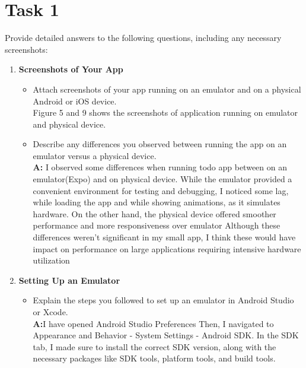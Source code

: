 \documentclass{article}
\begin{document}
        \newpage

        \section*{ Task 1 }

        Provide detailed answers to the following questions, including any necessary screenshots:

        \begin{enumerate}
            \item \textbf{Screenshots of Your App }
                \begin{itemize}
                    \item Attach screenshots of your app running on an emulator and on a physical Android or iOS device.
                    \\
                    Figure 5 and 9 shows the screenshots of application running on emulator and physical device.
                    
                    \item Describe any differences you observed between running the app on an emulator versus a physical device.\\
                    \textbf{A: }I observed some differences when running todo app between on an emulator(Expo) and on physical device. While the emulator provided a convenient environment for testing and debugging, I noticed some lag, while loading the app and while showing animations, as it simulates hardware. On the other hand, the physical device offered smoother performance and more responsiveness over emulator Although these differences weren't significant in my small app, I think these would have impact on performance on large applications requiring intensive hardware utilization 
                    
                    
                \end{itemize}
            \item \textbf{Setting Up an Emulator }
                \begin{itemize}
                    \item Explain the steps you followed to set up an emulator in Android Studio or Xcode.\\
                    \textbf{A:}I have opened Android Studio Preferences Then, I navigated to Appearance and Behavior - System Settings - Android SDK. In the SDK tab, I made sure to install the correct SDK version, along with the necessary packages like SDK tools, platform tools, and build tools.\\
                    

\end{itemize}
\end{enumerate}
\end{document}
